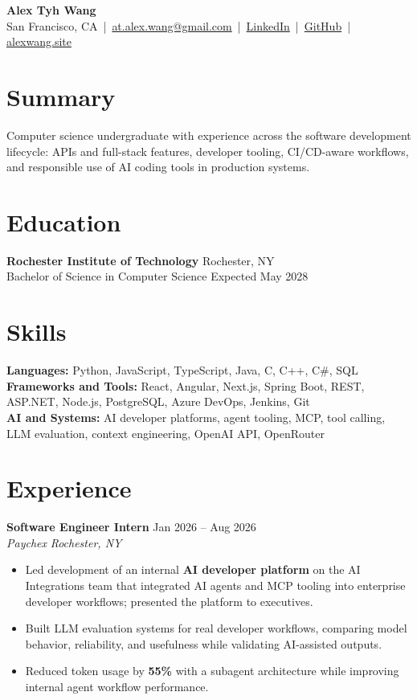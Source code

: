 \documentclass[10pt,letterpaper]{article}
\newif\ifresumeFirstRole
\newcommand{\resumeRole}[4]{%
  \ifresumeFirstRole
    \global\resumeFirstRolefalse
  \else
    \vspace{0pt plus 1fill}%
  \fi
  \textbf{#1} \hfill #2\\
  \textit{#3} \hfill \textit{#4}
}
\begin{document}
\begin{center}
{\Large \textbf{Alex Tyh Wang}}\\
San Francisco, CA \,|\, \href{mailto:at.alex.wang@gmail.com}{at.alex.wang@gmail.com} \,|\, \href{https://www.linkedin.com/in/alex-tyh-wang/}{LinkedIn} \,|\, \href{https://github.com/alextyhwang}{GitHub} \,|\, \href{https://alexwang.site}{alexwang.site}
\end{center}

\section*{Summary}
Computer science undergraduate with experience across the software development lifecycle: APIs and full-stack features, developer tooling, CI/CD-aware workflows, and responsible use of AI coding tools in production systems.

\section*{Education}
\textbf{Rochester Institute of Technology} \hfill Rochester, NY\\
Bachelor of Science in Computer Science \hfill Expected May 2028

\section*{Skills}
\textbf{Languages:} Python, JavaScript, TypeScript, Java, C, C++, C\#, SQL\\
\textbf{Frameworks and Tools:} React, Angular, Next.js, Spring Boot, REST, ASP.NET, Node.js, PostgreSQL, Azure DevOps, Jenkins, Git\\
\textbf{AI and Systems:} AI developer platforms, agent tooling, MCP, tool calling, LLM evaluation, context engineering, OpenAI API, OpenRouter

\section*{Experience}
\resumeRole{Software Engineer Intern}{Jan 2026 -- Aug 2026}{Paychex}{Rochester, NY}
\begin{itemize}
  \item Led development of an internal \textbf{AI developer platform} on the AI Integrations team that integrated AI agents and MCP tooling into enterprise developer workflows; presented the platform to executives.
  \item Built LLM evaluation systems for real developer workflows, comparing model behavior, reliability, and usefulness while validating AI-assisted outputs.
  \item Reduced token usage by \textbf{55\%} with a subagent architecture while improving internal agent workflow performance.
\end{itemize}
\end{document}
